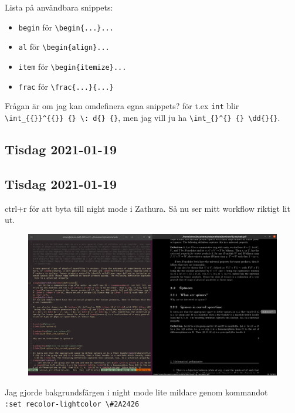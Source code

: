 Lista på användbara snippets:
\begin{itemize}
	\item \verb|begin| för \verb|\begin{...}...|
	\item \verb|al| för \verb|\begin{align}...|
	\item \verb|item| för \verb|\begin{itemize}...|
	\item \verb|frac| för \verb|\frac{...}{...}|
\end{itemize}
Frågan är om jag kan omdefinera egna snippets? för t.ex \verb|int| blir \verb|\int_{{}}^{{}} {} \: d{} {}|, men jag vill ju ha \verb|\int_{}^{} {} \dd{}{}|.


\subsection{Tisdag 2021-01-19}



\subsection{Tisdag 2021-01-19}

ctrl+r för att byta till night mode i Zathura. Så nu ser mitt workflow riktigt lit ut.
\begin{figure}[H]
	\centering
	\includegraphics[width=1.0\linewidth]{pics/workflow.png}
	\caption{}%
	\label{fig:workflow}
\end{figure}
Jag gjorde bakgrundsfärgen i night mode lite mildare genom kommandot\\
\verb|:set recolor-lightcolor \#2A2426|
